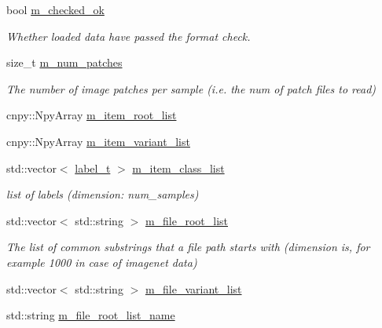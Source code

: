 \begin{DoxyCompactItemize}
\item 
bool \hyperlink{classlbann_1_1offline__patches__npz_ab434320c2084790a2c99257d6c39fc85}{m\+\_\+checked\+\_\+ok}
\begin{DoxyCompactList}\small\item\em Whether loaded data have passed the format check. \end{DoxyCompactList}\item 
size\+\_\+t \hyperlink{classlbann_1_1offline__patches__npz_a5c13583d344641295301f82a32ebee41}{m\+\_\+num\+\_\+patches}
\begin{DoxyCompactList}\small\item\em The number of image patches per sample (i.\+e. the num of patch files to read) \end{DoxyCompactList}\item 
cnpy\+::\+Npy\+Array \hyperlink{classlbann_1_1offline__patches__npz_a5d61c89e80f8e67b4850fb72792ce862}{m\+\_\+item\+\_\+root\+\_\+list}
\item 
cnpy\+::\+Npy\+Array \hyperlink{classlbann_1_1offline__patches__npz_a5aec35e7b2f9956b8e7e8ce5cbb3ff22}{m\+\_\+item\+\_\+variant\+\_\+list}
\item 
std\+::vector$<$ \hyperlink{classlbann_1_1offline__patches__npz_ae0ed6bf62b2be1814964206522ed4e05}{label\+\_\+t} $>$ \hyperlink{classlbann_1_1offline__patches__npz_a5f90dc1b898f8ad9d7ea16c188738419}{m\+\_\+item\+\_\+class\+\_\+list}
\begin{DoxyCompactList}\small\item\em list of labels (dimension\+: num\+\_\+samples) \end{DoxyCompactList}\item 
std\+::vector$<$ std\+::string $>$ \hyperlink{classlbann_1_1offline__patches__npz_a515ef05ef0679f3b6f1197d1ab47bfb3}{m\+\_\+file\+\_\+root\+\_\+list}
\begin{DoxyCompactList}\small\item\em The list of common substrings that a file path starts with (dimension is, for example 1000 in case of imagenet data) \end{DoxyCompactList}\item 
std\+::vector$<$ std\+::string $>$ \hyperlink{classlbann_1_1offline__patches__npz_a164d2bd134dc8c3946dc28d6ec5da0ec}{m\+\_\+file\+\_\+variant\+\_\+list}
\item 
std\+::string \hyperlink{classlbann_1_1offline__patches__npz_ab8c28a104b2c09f22831cb647f77d127}{m\+\_\+file\+\_\+root\+\_\+list\+\_\+name}

\end{DoxyCompactItemize}
